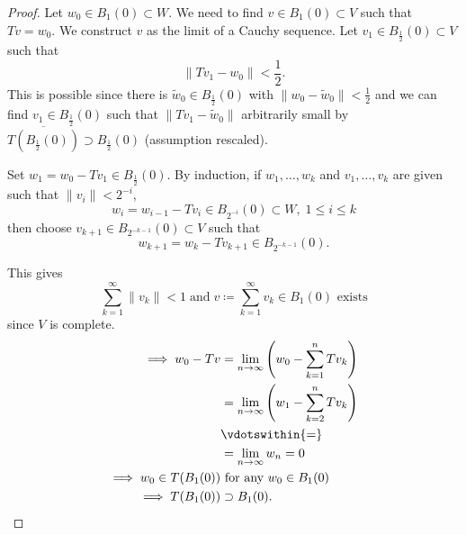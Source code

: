 \documentclass{article}
\begin{document}
\begin{proof}
    Let $w_0 \in B_1(0) \subset W$. We need to find $v \in B_1(0) \subset V$ such that $T v = w_0$. We construct $v$ as the limit of a Cauchy sequence.
    Let $v_1 \in B_{\frac{1}{2}}(0) \subset V$ such that
    \begin{equation*}\|Tv_1 - w_0\| < \frac{1}{2}.\end{equation*}
    This is possible since there is $\widetilde{w}_0 \in B_{\frac{1}{2}}(0)$ with $\|w_0 - \widetilde{w}_0\| < \frac{1}{2}$ and we can find $v_1 \in B_\frac{1}{2}(0)$ such that $\|Tv_1 - \widetilde{w}_0\|$ arbitrarily small by $\overline{T(B_\frac{1}{2}(0))} \supset B_\frac{1}{2}(0)$ (assumption rescaled).

    Set $w_1 = w_0 - T v_1 \in B_\frac{1}{2}(0)$.
    By induction, if $w_1, \dotsc, w_k$ and $v_1, \dotsc, v_k$ are given such that $\|v_i\| < 2^{-i}$,
    \begin{equation*}
        w_i = w_{i-1} - T v_i \in B_{2^{-i}}(0) \subset W, \; 1 \leq i \leq k
    \end{equation*}
    then choose $v_{k+1} \in B_{2^{-k-1}}(0) \subset V$ such that
    \begin{equation*}
        w_{k+1} = w_k - T v_{k+1} \in B_{2^{-k-1}}(0).
    \end{equation*}

    This gives
    \begin{equation*}
    \sum_{k=1}^\infty \|v_k\| < 1 \; \text{and} \; v \coloneqq \sum_{k=1}^\infty v_k \in B_1(0) \text{ exists}
    \end{equation*}
    since $V$ is complete.
    \begin{align*}
        \implies w_0 - Tv &= \lim_{n \to \infty} \left(w_0 - \sum_{k=1}^n T v_k\right) \\
                          &= \lim_{n \to \infty} \left(w_1 - \sum_{k=2}^n T v_k\right) \\
                          &\vdotswithin{=} \\
                          &= \lim_{n \to \infty} w_n = 0 \\
        \implies w_0 \in T(B_1(0)) &\text{ for any } w_0 \in B_1(0) \\
        \implies T(B_1(0)) &\supset B_1(0). \qedhere
    \end{align*}
\end{proof}

\end{document}
